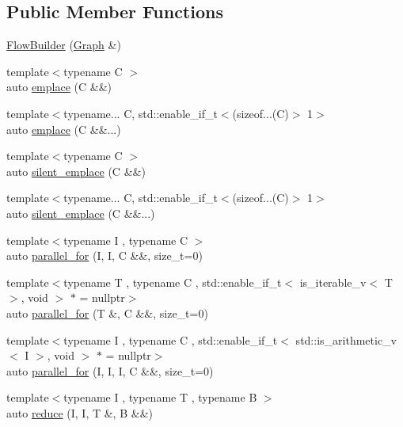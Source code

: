 \subsection*{Public Member Functions}
\begin{DoxyCompactItemize}
\item 
\hyperlink{classtf_1_1FlowBuilder_ab9fcccd3c62467052a263b2fd2ca406b}{Flow\+Builder} (\hyperlink{namespacetf_a2afa7da139285640eaf8122535136dc9}{Graph} \&)
\item 
{\footnotesize template$<$typename C $>$ }\\auto \hyperlink{classtf_1_1FlowBuilder_a6d9c6008100d099994362769d1ea7fbb}{emplace} (C \&\&)
\item 
{\footnotesize template$<$typename... C, std\+::enable\+\_\+if\+\_\+t$<$(sizeof...(\+C)$>$ 1$>$ }\\auto \hyperlink{classtf_1_1FlowBuilder_ac4ccd002efe1e62a328632ce704bcd7a}{emplace} (C \&\&...)
\item 
{\footnotesize template$<$typename C $>$ }\\auto \hyperlink{classtf_1_1FlowBuilder_af8cdada0684ce221c4c134e1504cabd6}{silent\+\_\+emplace} (C \&\&)
\item 
{\footnotesize template$<$typename... C, std\+::enable\+\_\+if\+\_\+t$<$(sizeof...(\+C)$>$ 1$>$ }\\auto \hyperlink{classtf_1_1FlowBuilder_ad313d46679d6e38c361dbe13c28cebf6}{silent\+\_\+emplace} (C \&\&...)
\item 
{\footnotesize template$<$typename I , typename C $>$ }\\auto \hyperlink{classtf_1_1FlowBuilder_a016f6bb3fd6719eda5211c7befab3830}{parallel\+\_\+for} (I, I, C \&\&, size\+\_\+t=0)
\item 
{\footnotesize template$<$typename T , typename C , std\+::enable\+\_\+if\+\_\+t$<$ is\+\_\+iterable\+\_\+v$<$ T $>$, void $>$ $\ast$  = nullptr$>$ }\\auto \hyperlink{classtf_1_1FlowBuilder_a688d084ec1b29c78405a07d40cddd03c}{parallel\+\_\+for} (T \&, C \&\&, size\+\_\+t=0)
\item 
{\footnotesize template$<$typename I , typename C , std\+::enable\+\_\+if\+\_\+t$<$ std\+::is\+\_\+arithmetic\+\_\+v$<$ I $>$, void $>$ $\ast$  = nullptr$>$ }\\auto \hyperlink{classtf_1_1FlowBuilder_a54836d5d8b01e2732ad80091d9f50c18}{parallel\+\_\+for} (I, I, I, C \&\&, size\+\_\+t=0)
\item 
{\footnotesize template$<$typename I , typename T , typename B $>$ }\\auto \hyperlink{classtf_1_1FlowBuilder_a977deae532c85dca046658a0048daa8e}{reduce} (I, I, T \&, B \&\&)

\end{DoxyCompactItemize}
